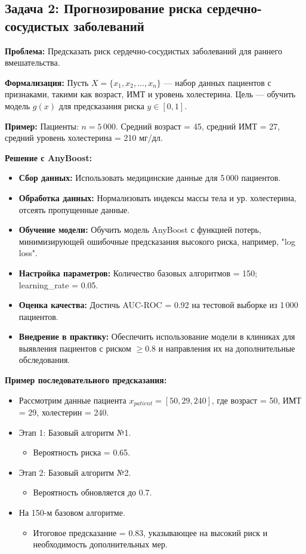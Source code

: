\subsection*{Задача 2: Прогнозирование риска сердечно-сосудистых заболеваний}

\textbf{Проблема:} Предсказать риск сердечно-сосудистых заболеваний для раннего вмешательства.

\textbf{Формализация:} 
Пусть $X = \{x_1, x_2, \ldots, x_n\}$ — набор данных пациентов с признаками, такими как возраст, ИМТ и уровень холестерина. Цель — обучить модель $g(x)$ для предсказания риска $y \in [0, 1]$.

\textbf{Пример:} 
Пациенты: $n = 5\,000$. Средний возраст = 45, средний ИМТ = 27, средний уровень холестерина = 210 мг/дл.

\textbf{Решение с AnyBoost:}
\begin{itemize}
    \item \textbf{Сбор данных:} Использовать медицинские данные для 5\,000 пациентов. 
    \item \textbf{Обработка данных:} Нормализовать индексы массы тела и ур. холестерина, отсеять пропущенные данные.
    \item \textbf{Обучение модели:} Обучить модель AnyBoost с функцией потерь, минимизирующей ошибочные предсказания высокого риска, например, "log loss".
    \item \textbf{Настройка параметров:} Количество базовых алгоритмов = 150; learning\_rate = 0.05.
    \item \textbf{Оценка качества:} Достичь AUC-ROC = 0.92 на тестовой выборке из 1\,000 пациентов.
    \item \textbf{Внедрение в практику:} Обеспечить использование модели в клиниках для выявления пациентов с риском $\geq 0.8$ и направления их на дополнительные обследования.
\end{itemize}

\textbf{Пример последовательного предсказания:}
\begin{itemize}
    \item Рассмотрим данные пациента $x_{patient} = [50, 29, 240]$, где возраст = 50, ИМТ = 29, холестерин = 240.
    \item Этап 1: Базовый алгоритм №1.
        \begin{itemize}
            \item Вероятность риска = 0.65.
        \end{itemize}
    \item Этап 2: Базовый алгоритм №2.
        \begin{itemize}
            \item Вероятность обновляется до 0.7.
        \end{itemize}
    \item На 150-м базовом алгоритме.
        \begin{itemize}
            \item Итоговое предсказание = 0.83, указывающее на высокий риск и необходимость дополнительных мер.
        \end{itemize}
\end{itemize}


